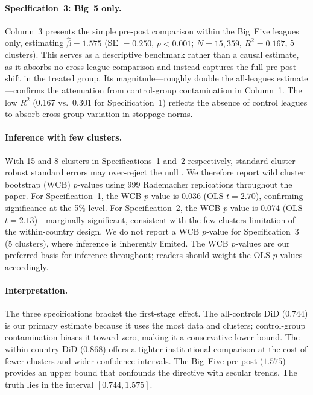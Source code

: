 \paragraph{Specification~3: Big~5 only.} Column~3 presents the simple pre-post comparison within the Big~Five leagues only, estimating $\hat{\beta} = 1.575$ (SE $= 0.250$, $p < 0.001$; $N = 15{,}359$, $R^2 = 0.167$, 5 clusters). This serves as a descriptive benchmark rather than a causal estimate, as it absorbs no cross-league comparison and instead captures the full pre-post shift in the treated group. Its magnitude---roughly double the all-leagues estimate---confirms the attenuation from control-group contamination in Column~1. The low $R^2$ (0.167 vs.\ 0.301 for Specification~1) reflects the absence of control leagues to absorb cross-group variation in stoppage norms.

\paragraph{Inference with few clusters.} With 15 and 8 clusters in Specifications~1 and~2 respectively, standard cluster-robust standard errors may over-reject the null \citep{cameron2008bootstrap, webb2023reworking}. We therefore report wild cluster bootstrap (WCB) $p$-values using 999 Rademacher replications throughout the paper. For Specification~1, the WCB $p$-value is 0.036 (OLS $t = 2.70$), confirming significance at the 5\% level. For Specification~2, the WCB $p$-value is 0.074 (OLS $t = 2.13$)---marginally significant, consistent with the few-clusters limitation of the within-country design. We do not report a WCB $p$-value for Specification~3 (5 clusters), where inference is inherently limited. The WCB $p$-values are our preferred basis for inference throughout; readers should weight the OLS $p$-values accordingly.

\paragraph{Interpretation.} The three specifications bracket the first-stage effect. The all-controls DiD ($0.744$) is our primary estimate because it uses the most data and clusters; control-group contamination biases it toward zero, making it a conservative lower bound. The within-country DiD ($0.868$) offers a tighter institutional comparison at the cost of fewer clusters and wider confidence intervals. The Big~Five pre-post ($1.575$) provides an upper bound that confounds the directive with secular trends. The truth lies in the interval $[0.744, 1.575]$.

